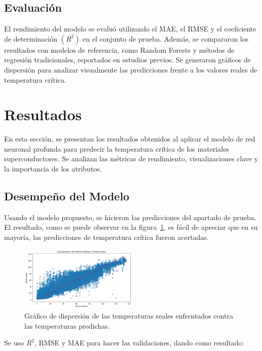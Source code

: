 \documentclass[conference]{IEEEtran} %
\begin{document}
\subsection{Evaluación}

El rendimiento del modelo se evaluó utilizando el MAE, el RMSE y 
el coeficiente de determinación $(R^2)$ en el conjunto de prueba. 
Además, se compararon los resultados con modelos de referencia, 
como Random Forests y métodos de regresión tradicionales, 
reportados en estudios previos. Se generaron gráficos de dispersión 
para analizar visualmente las predicciones frente a los valores 
reales de temperatura crítica.

\section{Resultados}

En esta sección, se presentan los resultados obtenidos al aplicar 
el modelo de red neuronal profunda para predecir la temperatura 
crítica de los materiales superconductores. Se analizan las 
métricas de rendimiento, visualizaciones clave y la importancia 
de los atributos.

\subsection{Desempeño del Modelo}

Usando el modelo propuesto, se hicieron las predicciones
del apartado de prueba. El resultado, como se puede observar en
la figura~\ref{fig:Entrenamiento}, es fácil de apreciar que en su mayoría,
las predicciones de temperatura crítica fueron acertadas.

\begin{figure}[!h]
    \centering
    \includegraphics[width=0.5\textwidth]{Entrenamiento.png}
    \caption{Gráfico de dispersión de las temperaturas reales enfrentados contra las temperaturas predichas.}
    \label{fig:Entrenamiento}
\end{figure}

Se uso $R^2$, RMSE y MAE para hacer las validaciones, dando como resultado:
\end{document}
